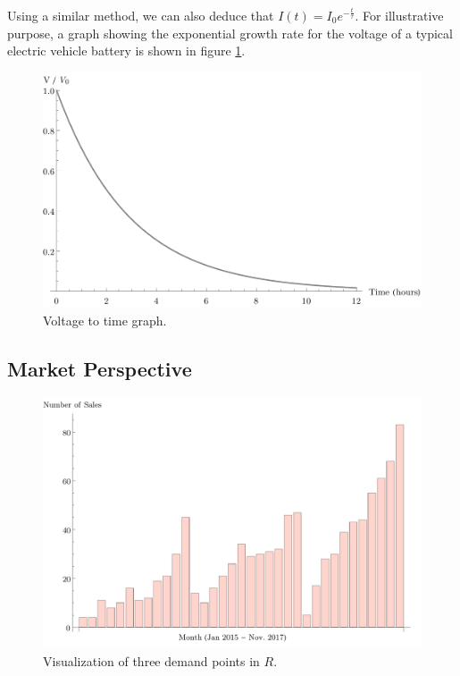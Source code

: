 \documentclass[10pt]{article}
\begin{document}
Using a similar method, we can also deduce that $I(t) = I_0 e^{-\frac{t}{\tau}}$. For illustrative purpose, a graph showing the exponential growth rate for the voltage of a typical electric vehicle battery is shown in figure \ref{fig:velocity}.
\begin{figure}
    \centering
    \includegraphics[scale=.8]{voltage.pdf}
    \caption{Voltage to time graph.}
    \label{fig:velocity}
\end{figure}

\subsection{Market Perspective}
\begin{figure}[htbp]
    \centering
    \includegraphics[scale = .68, trim=0 20pt 0 0, clip]{barchart_rose.pdf}
    \caption{\small Visualization of three demand points in $R$.}
    \end{figure}
   
\end{document}
